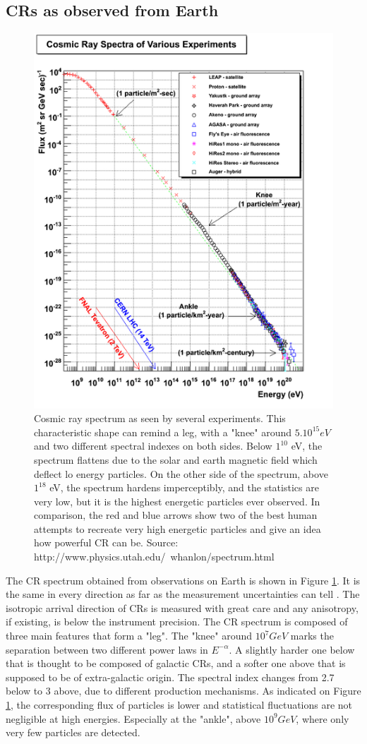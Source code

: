 \subsection{CRs as observed from Earth}

\begin{figure}[h]
 \centering
 \includegraphics[width=.5\linewidth]{pic/theory/CR_spectrum.png}
 \caption{Cosmic ray spectrum as seen by several experiments. This characteristic shape can remind a leg, with a "knee" around $5.10^{15} eV$ and two different spectral indexes on both sides. Below $1^{10}$ eV, the spectrum flattens due to the solar and earth magnetic field which deflect lo energy particles. On the other side of the spectrum, above $1^{18}$ eV, the spectrum hardens imperceptibly, and the statistics are very low, but it is the highest energetic particles ever observed. In comparison, the red and blue arrows show two of the best human attempts to recreate very high energetic particles and give an idea how powerful CR can be. Source: http://www.physics.utah.edu/~whanlon/spectrum.html}
 \label{fig:CR_spectrum}
\end{figure}

The CR spectrum obtained from observations on Earth is shown in Figure \ref{fig:CR_spectrum}. It is the same in every direction as far as the measurement uncertainties can tell \cite{Hillas1984}. The isotropic arrival direction of CRs is measured with great care and any anisotropy, if existing, is below the instrument precision.
The CR spectrum is composed of three main features that form a "leg". The "knee" around $10^{7} GeV$ marks the separation between two different power laws in $E^{-\alpha}$. A slightly harder one below that is thought to be composed of galactic CRs, and a softer one above that is supposed to be of extra-galactic origin. The spectral index changes from 2.7 below to 3 above, due to different production mechanisms. \cite{Biermann1995}
As indicated on Figure \ref{fig:CR_spectrum}, the corresponding flux of particles is lower and statistical fluctuations are not negligible at high energies. Especially at the "ankle", above $10^9 GeV$, where only very few particles are detected.


